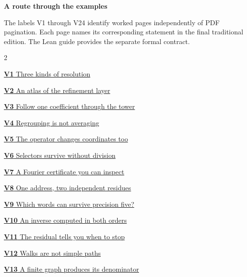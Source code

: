 \documentclass[11pt,a4paper]{article}
\begin{document}
\KomorebiCover
{}


{\sffamily\bfseries\Large\color{accent}A route through the examples}\par\medskip
The labels V1 through V24 identify worked pages independently of PDF
pagination. Each page names its corresponding statement in the final
traditional edition. The Lean guide provides the separate formal contract.
\medskip
\begin{multicols}{2}
{\small\noindent\hyperlink{vpage1}{\textbf{V1} Three kinds of resolution}\par\smallskip}
{\small\noindent\hyperlink{vpage2}{\textbf{V2} An atlas of the refinement layer}\par\smallskip}
{\small\noindent\hyperlink{vpage3}{\textbf{V3} Follow one coefficient through the tower}\par\smallskip}
{\small\noindent\hyperlink{vpage4}{\textbf{V4} Regrouping is not averaging}\par\smallskip}
{\small\noindent\hyperlink{vpage5}{\textbf{V5} The operator changes coordinates too}\par\smallskip}
{\small\noindent\hyperlink{vpage6}{\textbf{V6} Selectors survive without division}\par\smallskip}
{\small\noindent\hyperlink{vpage7}{\textbf{V7} A Fourier certificate you can inspect}\par\smallskip}
{\small\noindent\hyperlink{vpage8}{\textbf{V8} One address, two independent residues}\par\smallskip}
{\small\noindent\hyperlink{vpage9}{\textbf{V9} Which words can survive precision five?}\par\smallskip}
{\small\noindent\hyperlink{vpage10}{\textbf{V10} An inverse computed in both orders}\par\smallskip}
{\small\noindent\hyperlink{vpage11}{\textbf{V11} The residual tells you when to stop}\par\smallskip}
{\small\noindent\hyperlink{vpage12}{\textbf{V12} Walks are not simple paths}\par\smallskip}
{\small\noindent\hyperlink{vpage13}{\textbf{V13} A finite graph produces its denominator}\par\smallskip}

\end{multicols}
\end{document}
